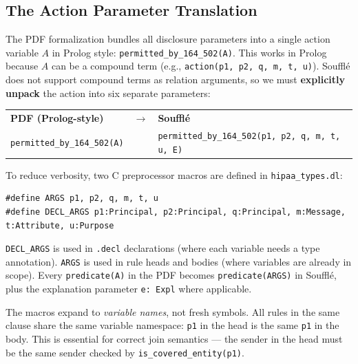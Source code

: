 \documentclass[11pt,letterpaper]{article}
\begin{document}
\subsection{The Action Parameter Translation}
\label{sec:action-param}

The PDF formalization bundles all disclosure parameters into a single action variable $A$ in Prolog style: \texttt{permitted\_by\_164\_502(A)}. This works in Prolog because $A$ can be a compound term (e.g., \texttt{action(p1, p2, q, m, t, u)}). Souffl\'{e} does not support compound terms as relation arguments, so we must \textbf{explicitly unpack} the action into six separate parameters:

\begin{center}
\begin{tabular}{lcl}
\textbf{PDF (Prolog-style)} & $\longrightarrow$ & \textbf{Souffl\'{e}} \\
\texttt{permitted\_by\_164\_502(A)} & & \texttt{permitted\_by\_164\_502(p1, p2, q, m, t, u, E)} \\
\end{tabular}
\end{center}

To reduce verbosity, two C preprocessor macros are defined in \texttt{hipaa\_types.dl}:

\begin{lstlisting}[style=soufflestyle,caption={Action parameter macros (from hipaa\_types.dl)}]
#define ARGS p1, p2, q, m, t, u
#define DECL_ARGS p1:Principal, p2:Principal, q:Principal, m:Message, t:Attribute, u:Purpose
\end{lstlisting}

\texttt{DECL\_ARGS} is used in \texttt{.decl} declarations (where each variable needs a type annotation). \texttt{ARGS} is used in rule heads and bodies (where variables are already in scope). Every \texttt{predicate(A)} in the PDF becomes \texttt{predicate(ARGS)} in Souffl\'{e}, plus the explanation parameter \texttt{e: Expl} where applicable.

\begin{warningbox}
The macros expand to \emph{variable names}, not fresh symbols. All rules in the same clause share the same variable namespace: \texttt{p1} in the head is the same \texttt{p1} in the body. This is essential for correct join semantics --- the sender in the head must be the same sender checked by \texttt{is\_covered\_entity(p1)}.
\end{warningbox}
\end{document}
